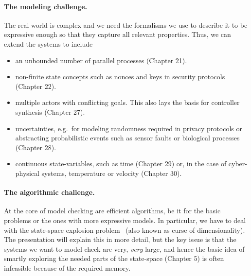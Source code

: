 \documentclass[11pt]{article}
\begin{document}
\paragraph{The modeling challenge.}
The real world is complex and we need the formalisms we use to describe it to be expressive enough so that they capture all relevant properties.
Thus, we can extend the systems to include
\begin{itemize}
	\item an unbounded number of parallel processes (Chapter 21).
	\item non-finite state concepts such as nonces and keys in security protocols (Chapter 22). 
	\item multiple actors with conflicting goals. This also lays the basis for controller synthesis (Chapter 27).
	\item uncertainties, e.g.\ for modeling randomness required in privacy protocols or abstracting probabilistic events such as sensor faults or biological processes (Chapter 28).
	\item continuous state-variables, such as time (Chapter 29) or, in the case of cyber-physical systems, temperature or velocity (Chapter 30). 
\end{itemize}



\paragraph{The algorithmic challenge.}
At the core of model checking are efficient algorithms, be it for the basic problems or the ones with more expressive models.
In particular, we have to deal with the state-space explosion problem~\cite[Chapter 2.3]{BK08} (also known as curse of dimensionality). 
The presentation will explain this in more detail, but the key issue is that the systems we want to model check are very, \emph{very} large, and hence the basic idea of smartly exploring the needed parts of the state-space (Chapter 5) is often infeasible because of the required memory.
\end{document}
